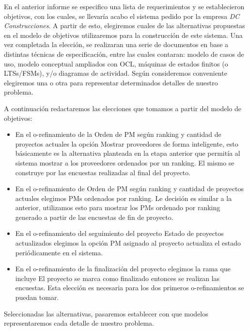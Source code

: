 En el anterior informe se especifico una lista de requerimientos y se establecieron objetivos, con los cuales,
se llevaría acabo el sistema pedido por la empresa \textit{DC Construcciones}. A partir de esto,
elegiremos cuales de las alternativas propuestas en el modelo de objetivos utilizaremos para la
construcción de este sistema. Una vez completada la elección, se realizaran una serie de documentos
en base a distintas técnicas de especificación, entre las cuales contaran: modelo de casos de uso,
modelo conceptual ampliados con OCL, máquinas de estados finitos (o LTSs/FSMs), y/o diagramas
de actividad. Según consideremos conveniente elegiremos una o otra para representar determinados
detalles de nuestro problema.

A continuación redactaremos las elecciones que tomamos a partir del modelo de objetivos:

\begin{itemize}
\item En el o-refinamiento de la Orden de PM según ranking y cantidad de proyectos actuales la opción Mostrar proveedores de forma inteligente, esto básicamente es la alternativa planteada
en la etapa anterior que permitía al sistema mostrar a los proveedores ordenados por un ranking. El mismo se construye por las encuestas realizadas al final
del proyecto.
\item En el o-refinamiento de Orden de PM según ranking y cantidad de proyectos actuales elegimos PMs ordenados por ranking. Le decisión es similar a la anterior,
utilizamos esto para mostrar los PMs ordenado por ranking generado a partir de las encuestas de fin de proyecto.
\item En el o-refinamiento del seguimiento del proyecto Estado de proyectos actualizados elegimos la opción PM asignado al proyecto
actualiza el estado periódicamente en el sistema.
\item En el o-refinamiento de la finalización del proyecto elegimos la rama que incluye El proyecto se marca como finalizado entonces se realizan
las encuestas. Esta elección es necesaria para los dos primeros o-refinamientos se puedan tomar.
\end{itemize}

Seleccionadas las alternativas, pasaremos establecer con que modelos representaremos cada detalle de nuestro problema.

